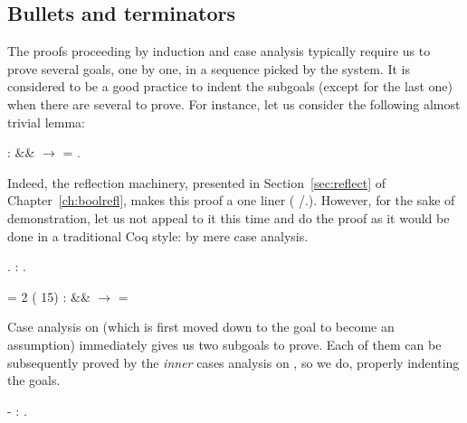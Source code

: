 \subsection{Bullets and terminators}




The proofs proceeding by induction and case analysis typically require
us to prove several goals, one by one, in a sequence picked by the
system.  It is considered to be a good practice to indent the subgoals
(except for the last one) when there are several to prove. For
instance, let us consider the following almost trivial lemma:


\begin{coqdoccode}
\coqdocemptyline
\coqdocnoindent
{}   :  \&\&  \ensuremath{\rightarrow}  = .\coqdoceol
\coqdocemptyline
\end{coqdoccode}


Indeed, the reflection machinery, presented in
Section~\ref{sec:reflect} of Chapter~\ref{ch:boolrefl}, makes this
proof a one liner ( /.). However, for the sake of
demonstration, let us not appeal to it this time and do the proof as
it would be done in a traditional Coq style: by mere case analysis.


 \begin{coqdoccode}
\coqdocemptyline
\coqdocnoindent
{}.\coqdoceol
\coqdocnoindent
{}: .\coqdoceol
\coqdocemptyline
\end{coqdoccode}


\coqdoceol
\coqdocemptyline
\coqdocnoindent
{} = \coqdoceol
\coqdocnoindent
\coqdoceol
\coqdocnoindent
{} 2 ( 15) :\coqdoceol
\coqdocindent{0.50em}
 \&\&  \ensuremath{\rightarrow}  = 

\coqdocemptyline


Case analysis on  (which is first moved down to the goal to become
an assumption) immediately gives us two subgoals to prove. Each of
them can be subsequently proved by the \textit{inner} cases analysis on ,
so we do, properly indenting the goals.


\begin{coqdoccode}
\coqdocemptyline
\coqdocnoindent
-  : .\coqdoceol
\coqdocemptyline
\end{coqdoccode}


